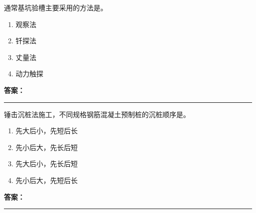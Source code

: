 \documentclass[UTF8,fontset=fandol,11pt]{ctexart}
\newcommand{\answerline}{\textcolor{answerred}{\rule{2.4cm}{0.7pt}}}
\begin{document}
\begin{quizbox}[title={乱序第 160 题｜第一章土方工程}]

通常基坑验槽主要采用的方法是。\\

\begin{enumerate}[label=\Alph*.]

\item 观察法

\item 钎探法

\item 丈量法

\item 动力触探

\end{enumerate}

\textbf{\textcolor{answerred}{答案：}} \answerline

\end{quizbox}

\vspace{0.2em}

\begin{quizbox}[title={乱序第 161 题｜第二章桩基础工程}]

锤击沉桩法施工，不同规格钢筋混凝土预制桩的沉桩顺序是。\\

\begin{enumerate}[label=\Alph*.]

\item 先大后小，先短后长

\item 先小后大，先长后短

\item 先大后小，先长后短

\item 先小后大，先短后长

\end{enumerate}

\textbf{\textcolor{answerred}{答案：}} \answerline

\end{quizbox}

\vspace{0.2em}
\end{document}
